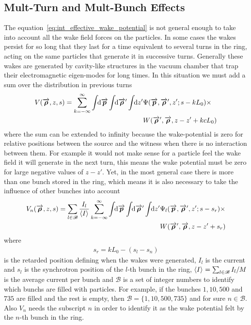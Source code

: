 \subsection{Mult-Turn and Mult-Bunch Effects}

    The equation~\eqref{eq:int_effective_wake_potential} is not general enough to take into account all the wake field forces on the particles. In some cases the wakes persist for so long that they last for a time equivalent to several turns in the ring, acting on the same particles that generate it in successive turns. Generally these wakes are generated by cavity-like structures in the vacuum chamber that trap their electromagnetic eigen-modes for long times. In this situation we must add a sum over the distribution in previous turns
    \begin{align}\nonumber
  	  	V(\overrightarrow{\boldsymbol{\rho}}, z, s) = \sum_{k=-\infty}^\infty\int\!\!\text{d}\overrightarrow{\boldsymbol{p}} \int\!\!\text{d}\overrightarrow{\boldsymbol{\rho}}' \int\!\!\text{d}z' 
	  			&\Psi(\overrightarrow{\boldsymbol{p}},\overrightarrow{\boldsymbol{\rho}}',z'; s-kL_0)\times\\ &W(\overrightarrow{\boldsymbol{\rho}}',\overrightarrow{\boldsymbol{\rho}},z-z' + kcL_0)
    \end{align}
    where the sum can be extended to infinity because the wake-potential is zero for relative positions between the source and the witness when there is no interaction between them. For example it would not make sense for a particle feel the wake field it will generate in the next turn, this means the wake potential must be zero for large negative values of $z-z'$. Yet, in the most general case there is more than one bunch stored in the ring, which means it is also necessary to take the influence of other bunches into account
    \begin{align}\label{eq:general_eff_wake_pot}\nonumber
  	  	V_n(\overrightarrow{\boldsymbol{\rho}}, z, s) = \sum_{l\in\mathscr{B}}\frac{I_l}{\left\langle I \right\rangle_{{}}}\sum_{k=-\infty}^\infty\int\!\!\text{d}\overrightarrow{\boldsymbol{p}} \int\!\!\text{d}\overrightarrow{\boldsymbol{\rho}}' \int\!\!\text{d}z' 
	  			&\Psi_l(\overrightarrow{\boldsymbol{p}},\overrightarrow{\boldsymbol{\rho}}',z'; s - s_r) \times\\
				&W(\overrightarrow{\boldsymbol{\rho}}',\overrightarrow{\boldsymbol{\rho}},z - z' + s_r)
    \end{align}
    where
    \begin{align}\label{eq:retarded_time_definition}
        s_r = kL_0-(s_l-s_n)
    \end{align}
    is the retarded position defining when the wakes were generated, $I_l$ is the current and $s_l$ is the synchrotron position of the $l$-th bunch in the ring, $\left\langle I \right\rangle_{{}}=\sum_{l\in\mathscr{B}}I_l/M$ is the average current per bunch and $\mathscr{B}$ is a set of integer numbers to identify which bunchs are filled with particles. For example, if the bunches $1, 10, 500$ and $735$ are filled and the rest is empty, then $\mathscr{B} = \{ 1, 10, 500, 735 \}$ and for sure $n\in\mathscr{B}$. Also $V_n$ needs the subscript $n$ in order to identify it as the wake potential felt by the $n$-th bunch in the ring.

